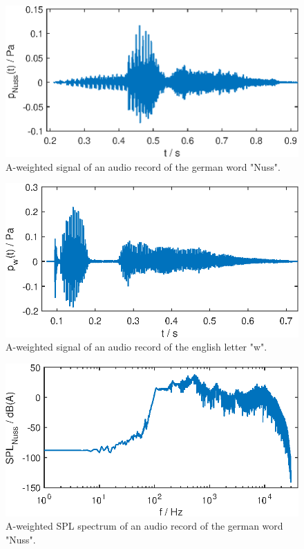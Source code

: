 \begin{figure}[h] 
  \centering
  \includegraphics[width=.9\linewidth]{ue2/sa_nuss.eps} %
  \caption{A-weighted signal of an audio record of the german word "Nuss".}
  \label{fig:nuss_a}
\end{figure}


\begin{figure}[h] 
  \centering
  \includegraphics[width=.9\linewidth]{ue2/sa_w.eps} %
  \caption{A-weighted signal of an audio record of the english letter "w".}
  \label{fig:w_a}
\end{figure}

\begin{figure}[h] 
  \centering
  \includegraphics[width=.9\linewidth]{ue2/sa_nuss_pegel.eps} %
  \caption{A-weighted SPL spectrum of an audio record of the german word "Nuss".}
  \label{fig:nuss_pegel_a}
\end{figure}

